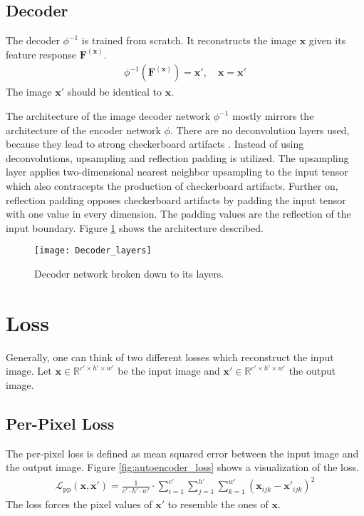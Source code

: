 \subsection{Decoder}
The decoder $\phi^{-1}$ is trained from scratch. It reconstructs the image $\mathbf{x}$ given its feature response $\mathbf{F}^{(\mathbf{x})}$.
\begin{align}
\phi^{-1}(\mathbf{F}^{(\mathbf{x})}) = \mathbf{x}', \quad \mathbf{x} = \mathbf{x}'
\end{align}
The image $\mathbf{x}'$ should be identical to $\mathbf{x}$.

The architecture of the image decoder network $\phi^{-1}$ mostly mirrors the architecture of the encoder network $\phi$. There are no deconvolution layers used, because they lead to strong checkerboard artifacts \cite{odena2016deconvolution}. Instead of using deconvolutions, upsampling and reflection padding is utilized. The upsampling layer applies two-dimensional nearest neighbor upsampling to the input tensor which also contracepts the production of checkerboard artifacts. Further on, reflection padding opposes checkerboard artifacts by padding the input tensor with one value in every dimension. The padding values are the reflection of the input boundary. Figure \ref{fig:decoder_network_layers} shows the architecture described.
\begin{figure}[!ht]
	\centering
  	\texttt{[image: Decoder\_layers]}
	\caption{Decoder network broken down to its layers.}
	\label{fig:decoder_network_layers}
\end{figure}

\section{Loss}
Generally, one can think of two different losses which reconstruct the input image. Let $\mathbf{x} \in \mathbb{R}^{c' \times h' \times w'}$ be the input image and $\mathbf{x}' \in \mathbb{R}^{c' \times h' \times w'}$ the output image. 

\subsection{Per-Pixel Loss}
The per-pixel loss is defined as mean squared error between the input image and the output image. Figure \ref{fig:autoencoder_loss} shows a visualization of the loss.
\begin{align}
\mathcal{L}_{\mathrm{pp}} 
\left(
\mathbf{x},
\mathbf{x}'
\right)
= 
\frac
{1}
{c' \cdot h' \cdot w'}
\cdot 
\sum_{i=1}^{c'}
\sum_{j=1}^{h'} 
\sum_{k=1}^{w'} 
\left( 
\mathbf{x}_{ijk} 
- 
\mathbf{x}'_{ijk}
\right)
^2
\end{align}
The loss forces the pixel values of $\mathbf{x}'$ to resemble the ones of $\mathbf{x}$.

